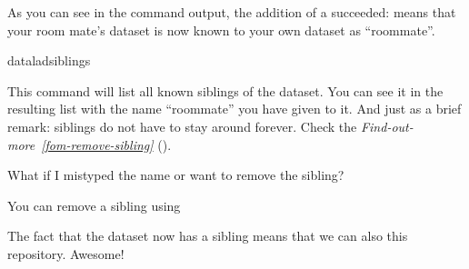 \sphinxAtStartPar
As you can see in the command output, the addition of a {\hyperref[\detokenize{glossary:term-sibling}]{}} succeeded:
 means that your room mate’s dataset
is now known to your own dataset as “roommate”.

\ignorespaces 
\def\sphinxLiteralBlockLabel{\label{\detokenize{basics/101-121-siblings:index-4}}}
\begin{sphinxVerbatim}[commandchars=\\\{\}]
dataladsiblings
\end{sphinxVerbatim}

\sphinxAtStartPar
This command will list all known siblings of the dataset. You can see it
in the resulting list with the name “roommate” you have given to it.
And just as a brief remark: siblings do not have to stay around forever.
Check the \textit{Find-out-more}~{\findoutmoreiconinline}\textit{\ref{fom-remove-sibling}} {\hyperref[\detokenize{basics/101-121-siblings:fom-remove-sibling}]{}} ().

\ignorespaces \begin{findoutmore}[label={fom-remove-sibling}, before title={\thetcbcounter\ }, float, floatplacement=tbp, check odd page=true]{What if I mistyped the name or want to remove the sibling?}
\label{\detokenize{basics/101-121-siblings:fom-remove-sibling}}

\sphinxAtStartPar
You can remove a sibling using 


\end{findoutmore}

\sphinxAtStartPar
The fact that the  dataset now has a sibling means that we
can also  this repository. Awesome!

